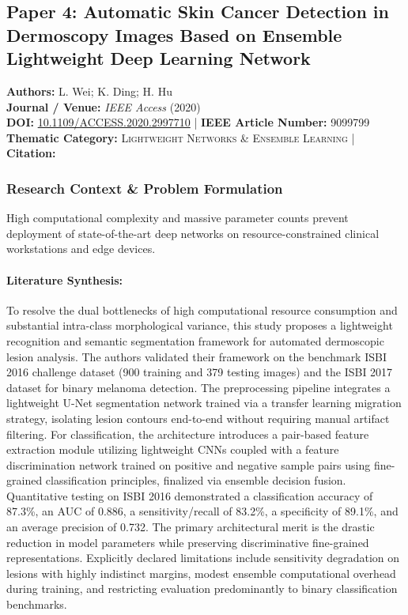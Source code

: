 \subsection{Paper 4: Automatic Skin Cancer Detection in Dermoscopy Images Based on Ensemble Lightweight Deep Learning Network}
\label{sec:paper_4}

\begin{tcolorbox}[colback=gray!5!white,colframe=gray!75!black,title=\textbf{Metadata \& Citation Summary}]
\textbf{Authors:} L. Wei; K. Ding; H. Hu \\
\textbf{Journal / Venue:} \textit{IEEE Access} (2020) \\
\textbf{DOI:} \href{https://doi.org/10.1109/ACCESS.2020.2997710}{10.1109/ACCESS.2020.2997710} \quad | \quad \textbf{IEEE Article Number:} 9099799 \\
\textbf{Thematic Category:} \textsc{Lightweight Networks \& Ensemble Learning} \quad | \quad \textbf{Citation:} \cite{9099799}
\end{tcolorbox}

\subsubsection*{Research Context \& Problem Formulation}
High computational complexity and massive parameter counts prevent deployment of state-of-the-art deep networks on resource-constrained clinical workstations and edge devices.

\paragraph{Literature Synthesis:} To resolve the dual bottlenecks of high computational resource consumption and substantial intra-class morphological variance, this study proposes a lightweight recognition and semantic segmentation framework for automated dermoscopic lesion analysis. The authors validated their framework on the benchmark ISBI 2016 challenge dataset (900 training and 379 testing images) and the ISBI 2017 dataset for binary melanoma detection. The preprocessing pipeline integrates a lightweight U-Net segmentation network trained via a transfer learning migration strategy, isolating lesion contours end-to-end without requiring manual artifact filtering. For classification, the architecture introduces a pair-based feature extraction module utilizing lightweight CNNs coupled with a feature discrimination network trained on positive and negative sample pairs using fine-grained classification principles, finalized via ensemble decision fusion. Quantitative testing on ISBI 2016 demonstrated a classification accuracy of 87.3\%, an AUC of 0.886, a sensitivity/recall of 83.2\%, a specificity of 89.1\%, and an average precision of 0.732. The primary architectural merit is the drastic reduction in model parameters while preserving discriminative fine-grained representations. Explicitly declared limitations include sensitivity degradation on lesions with highly indistinct margins, modest ensemble computational overhead during training, and restricting evaluation predominantly to binary classification benchmarks.

